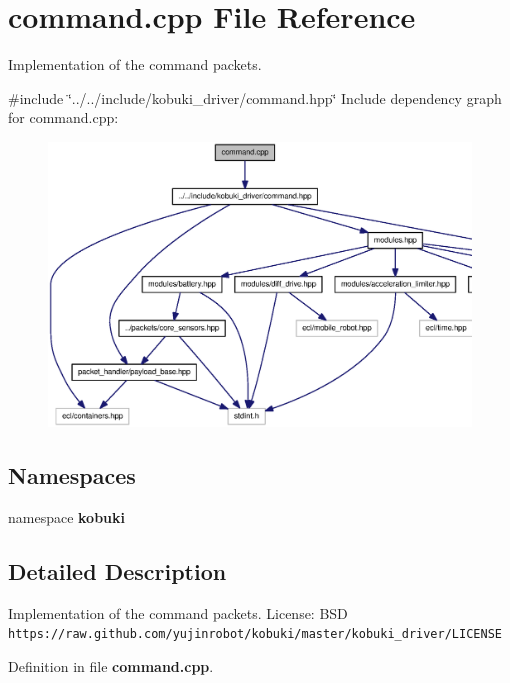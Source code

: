 \section{command.\-cpp \-File \-Reference}
\label{command_8cpp}


\-Implementation of the command packets.  


{\ttfamily \#include \char`\"{}../../include/kobuki\-\_\-driver/command.\-hpp\char`\"{}}\*
\-Include dependency graph for command.\-cpp\-:
\nopagebreak
\begin{figure}[H]
\begin{center}
\leavevmode
\includegraphics[width=350pt]{command_8cpp__incl}
\end{center}
\end{figure}
\subsection*{\-Namespaces}
\begin{DoxyCompactItemize}
\item 
namespace {\bf kobuki}
\end{DoxyCompactItemize}


\subsection{\-Detailed \-Description}
\-Implementation of the command packets. \-License\-: \-B\-S\-D {\tt https\-://raw.\-github.\-com/yujinrobot/kobuki/master/kobuki\-\_\-driver/\-L\-I\-C\-E\-N\-S\-E} 

\-Definition in file {\bf command.\-cpp}.

